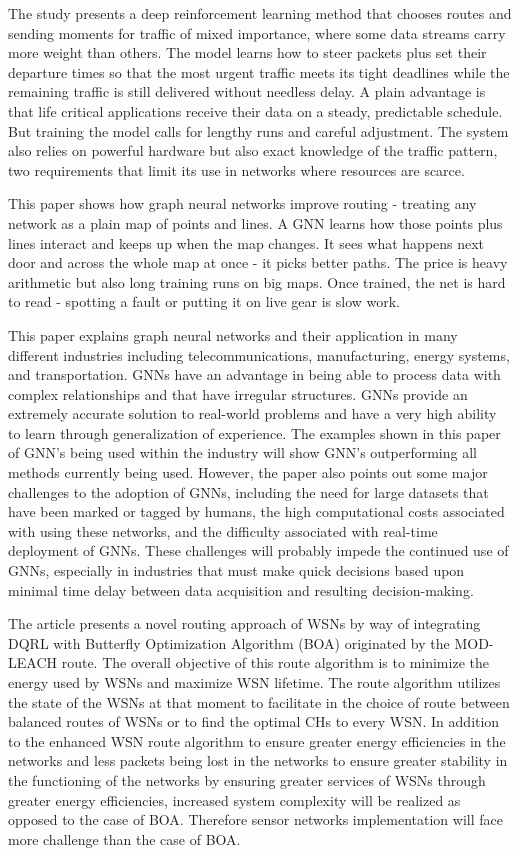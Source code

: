 \documentclass[a4paper,fleqn]{cas-dc}
\numberwithin{equation}{section}
\begin{document}
The study \cite{Yu20238806} presents a deep reinforcement learning method that chooses routes and sending moments for traffic of mixed importance, where some data streams carry more weight than others. The model learns how to steer packets plus set their departure times so that the most urgent traffic meets its tight deadlines while the remaining traffic is still delivered without needless delay. A plain advantage is that life critical applications receive their data on a steady, predictable schedule. But training the model calls for lengthy runs and careful adjustment. The system also relies on powerful hardware but also exact knowledge of the traffic pattern, two requirements that limit its use in networks where resources are scarce.

This paper \cite{Jiang2024} shows how graph neural networks improve routing - treating any network as a plain map of points and lines. A GNN learns how those points plus lines interact and keeps up when the map changes. It sees what happens next door and across the whole map at once - it picks better paths. The price is heavy arithmetic but also long training runs on big maps. Once trained, the net is hard to read - spotting a fault or putting it on live gear is slow work.

This paper \cite{LuSDN2025} explains graph neural networks and their application in many different industries including telecommunications, manufacturing, energy systems, and transportation. GNNs have an advantage in being able to process data with complex relationships and that have irregular structures. GNNs provide an extremely accurate solution to real-world problems and have a very high ability to learn through generalization of experience. The examples shown in this paper of GNN’s being used within the industry will show GNN’s outperforming all methods currently being used. However, the paper also points out some major challenges to the adoption of GNNs, including the need for large datasets that have been marked or tagged by humans, the high computational costs associated with using these networks, and the difficulty associated with real-time deployment of GNNs. These challenges will probably impede the continued use of GNNs, especially in industries that must make quick decisions based upon minimal time delay between data acquisition and resulting decision-making.

The article \cite{Devika20241329} presents a novel routing approach of WSNs by way of integrating DQRL with Butterfly Optimization Algorithm (BOA) originated by the MOD-LEACH route. The overall objective of this route algorithm is to minimize the energy used by WSNs and maximize WSN lifetime. The route algorithm utilizes the state of the WSNs at that moment to facilitate in the choice of route between balanced routes of WSNs or to find the optimal CHs to every WSN. In addition to the enhanced WSN route algorithm to ensure greater energy efficiencies in the networks and less packets being lost in the networks to ensure greater stability in the functioning of the networks by ensuring greater services of WSNs through greater energy efficiencies, increased system complexity will be realized as opposed to the case of BOA. Therefore sensor networks implementation will face more challenge than the case of BOA.
\end{document}
